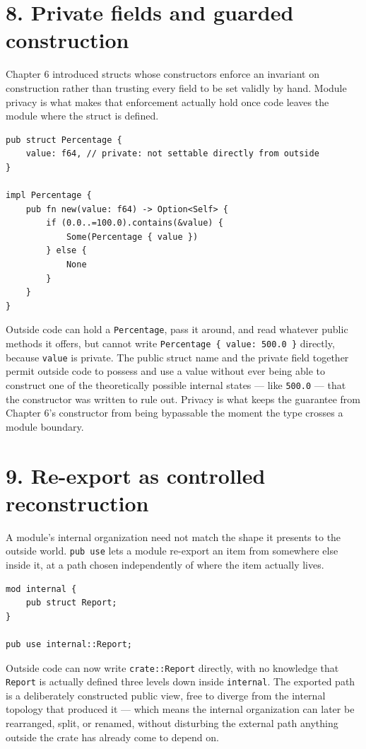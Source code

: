 \documentclass[11pt]{book}
\begin{document}
\section*{8. Private fields and guarded construction}

Chapter 6 introduced structs whose constructors enforce an invariant on construction rather than trusting every field to be set validly by hand. Module privacy is what makes that enforcement actually hold once code leaves the module where the struct is defined.

\begin{lstlisting}
pub struct Percentage {
    value: f64, // private: not settable directly from outside
}

impl Percentage {
    pub fn new(value: f64) -> Option<Self> {
        if (0.0..=100.0).contains(&value) {
            Some(Percentage { value })
        } else {
            None
        }
    }
}
\end{lstlisting}

Outside code can hold a \texttt{Percentage}, pass it around, and read whatever public methods it offers, but cannot write \texttt{Percentage \{ value: 500.0 \}} directly, because \texttt{value} is private. The public struct name and the private field together permit outside code to possess and use a value without ever being able to construct one of the theoretically possible internal states --- like \texttt{500.0} --- that the constructor was written to rule out. Privacy is what keeps the guarantee from Chapter 6's constructor from being bypassable the moment the type crosses a module boundary.

\section*{9. Re-export as controlled reconstruction}

A module's internal organization need not match the shape it presents to the outside world. \texttt{pub use} lets a module re-export an item from somewhere else inside it, at a path chosen independently of where the item actually lives.

\begin{lstlisting}
mod internal {
    pub struct Report;
}

pub use internal::Report;
\end{lstlisting}

Outside code can now write \texttt{crate::Report} directly, with no knowledge that \texttt{Report} is actually defined three levels down inside \texttt{internal}. The exported path is a deliberately constructed public view, free to diverge from the internal topology that produced it --- which means the internal organization can later be rearranged, split, or renamed, without disturbing the external path anything outside the crate has already come to depend on.
\end{document}
